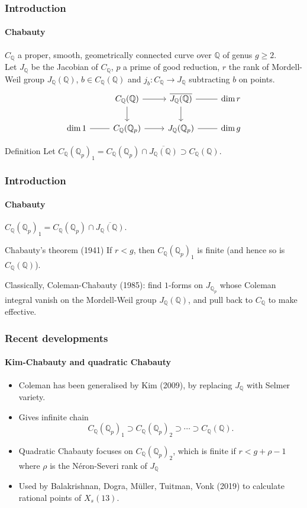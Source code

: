 \documentclass[15pt]{beamer}
\newcommand{\Q}{\mathbb{Q}}
\begin{document}
\begin{frame}
    \frametitle{Introduction}
    \framesubtitle{Chabauty}
    $C_\Q$ a proper, smooth, geometrically connected curve over $\Q$ of genus $g \geq 2$.\\
    Let $J_\Q$ be the Jacobian of $C_\Q$, $p$ a prime of good reduction, $r$ the rank of Mordell-Weil group $J_\Q(\Q)$, $b\in C_\Q(\Q)$ and $j_b: C_\Q \to J_\Q$ subtracting $b$ on points.\\ 
    \[
\begin{tikzcd}[ampersand replacement=\&]
\& C_\Q(\Q) \arrow[d] \arrow[r] \& \overline{J_\Q(\Q)} \arrow[d] \arrow[r, no head] \& \dim r\\
\dim 1 \arrow[r, no head] \& C_\Q(\Q_p) \arrow[r]              \& J_\Q(\Q_p)   \arrow[r, no head]  \& \dim g   
\end{tikzcd}
\]\pause
    \begin{block}{Definition}
        Let $C_\Q(\Q_p)_1 = C_\Q(\Q_p) \cap \overline{J_\Q(\Q)} \supset C_\Q(\Q)$.
    \end{block}\pause
\end{frame}

\begin{frame}
    \frametitle{Introduction}
    \framesubtitle{Chabauty}
    $C_\Q(\Q_p)_1 = C_\Q(\Q_p) \cap \overline{J_\Q(\Q)}$.
    \begin{block}{Chabauty's theorem (1941)}
        If $r < g$, then $C_\Q(\Q_p)_1$ is finite (and hence so is $C_\Q(\Q)$).
    \end{block}\pause
    Classically, Coleman-Chabauty (1985): find $1$-forms on $J_{\Q_p}$ whose Coleman integral vanish on the Mordell-Weil group $J_{\Q}(\Q)$, and pull back to $C_\Q$ to make effective.
\end{frame}

\begin{frame}
    \frametitle{Recent developments}
    \framesubtitle{Kim-Chabauty and quadratic Chabauty}
    \begin{itemize}[<+->]
        \item Coleman has been generalised by Kim (2009), by replacing $J_\Q$ with Selmer variety.
        \item Gives infinite chain\[ C_\Q(\Q_p)_1 \supset C_\Q(\Q_p)_2 \supset \cdots \supset C_\Q(\Q).\]
        \item Quadratic Chabauty focuses on $C_\Q(\Q_p)_2$, which is finite if $r < g + \rho - 1$ where $\rho$ is the N\'eron-Severi rank of $J_\Q$
        \item Used by Balakrishnan, Dogra, M\"uller, Tuitman, Vonk (2019) to calculate rational points of $X_s(13)$.
    \end{itemize}
\end{frame}
\end{document}
